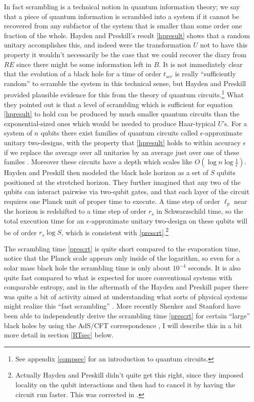 \documentclass[12pt]{article}
\begin{document}
In fact scrambling is a technical notion in quantum information theory; we say that a piece of quantum information is scrambled into a system if it cannot be recovered from any subfactor of the system that is smaller than some order one fraction of the whole.  Hayden and Preskill's result \eqref{hpresult} shows that a random unitary accomplishes this, and indeed were the transformation $U$ not to have this property it wouldn't necessarily be the case that we could recover the diary from $RE$ since there might be some information left in $B$.  It is not immediately clear that the evolution of a black hole for a time of order $t_{scr}$ is really ``sufficiently random'' to scramble the system in this technical sense, but Hayden and Preskill provided plausible evidence for this from the theory of quantum circuits.\footnote{See appendix \ref{compsec} for an introduction to quantum circuits.}  What they pointed out is that a level of scrambling which is sufficient for equation \eqref{hpresult} to hold can be produced by much smaller quantum circuits than the exponential-sized ones which would be needed to produce Haar-typical $U$'s.  For a system of $n$ qubits there exist families of quantum circuits called $\epsilon$-approximate unitary two-designs, with the property that \eqref{hpresult} holds to within accuracy $\epsilon$ if we replace the average over all unitaries by an average just over one of these familes \cite{dankert2009exact}.  Moreover these circuits have a depth which scales like $O\left(\log n \log\frac{1}{\epsilon}\right)$. Hayden and Preskill then modeled the black hole horizon as a set of $S$ qubits positioned at the stretched horizon.  They further imagined that any two of the qubits can interact pairwise via two-qubit gates, and that each layer of the circuit requires one Planck unit of proper time to execute.  A time step of order $\ell_p$ near the horizon is redshifted to a time step of order $r_s$ in Schwarzschild time, so the total execution time for an $\epsilon$-approximate unitary two-design on these qubits will be of order $r_s\log S$, which is consistent with \eqref{prescrt}.\footnote{Actually Hayden and Preskill didn't quite get this right, since they imposed locality on the qubit interactions and then had to cancel it by having the circuit run faster.  This was corrected in \cite{Sekino:2008he}.}


The scrambling time \eqref{prescrt} is quite short compared to the evaporation time, notice that the Planck scale appears only inside of the logarithm, so even for a solar mass black hole the scrambling time is only about $10^{-4}$ seconds.  It is also quite fast compared to what is expected for more conventional systems with comparable entropy, and in the aftermath of the Hayden and Preskill paper there was quite a bit of activity aimed at understanding what sorts of physical systems might realize this ``fast scrambling'' \cite{Sekino:2008he,Lashkari:2011yi,Barbon:2011pn,Barbon:2012zv}.  More recently Shenker and Stanford have been able to independently derive the scrambling time \eqref{prescrt} for certain ``large'' black holes by using the AdS/CFT correspondence \cite{Shenker:2013pqa,Shenker:2013yza}, I will describe this in a bit more detail in section \ref{RTsec} below.
\end{document}
